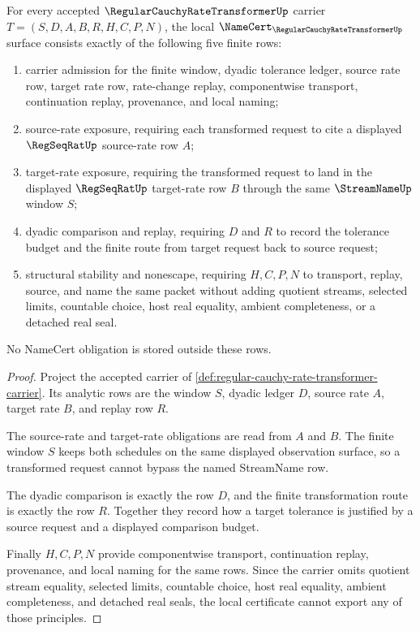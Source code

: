 \begin{theorem}
\label{thm:regular-cauchy-rate-transformer-namecert-obligations}
For every accepted $\RegularCauchyRateTransformerUp$ carrier $T=(S,D,A,B,R,H,C,P,N)$, the local $\NameCert_{\RegularCauchyRateTransformerUp}$ surface consists exactly of the following five finite rows:
\begin{enumerate}
\item carrier admission for the finite window, dyadic tolerance ledger, source rate row, target rate row, rate-change replay, componentwise transport, continuation replay, provenance, and local naming;
\item source-rate exposure, requiring each transformed request to cite a displayed $\RegSeqRatUp$ source-rate row $A$;
\item target-rate exposure, requiring the transformed request to land in the displayed $\RegSeqRatUp$ target-rate row $B$ through the same $\StreamNameUp$ window $S$;
\item dyadic comparison and replay, requiring $D$ and $R$ to record the tolerance budget and the finite route from target request back to source request;
\item structural stability and nonescape, requiring $H,C,P,N$ to transport, replay, source, and name the same packet without adding quotient streams, selected limits, countable choice, host real equality, ambient completeness, or a detached real seal.
\end{enumerate}
No NameCert obligation is stored outside these rows.
\end{theorem}
\begin{proof}
Project the accepted carrier of \autoref{def:regular-cauchy-rate-transformer-carrier}. Its analytic rows are the window $S$, dyadic ledger $D$, source rate $A$, target rate $B$, and replay row $R$.

The source-rate and target-rate obligations are read from $A$ and $B$. The finite window $S$ keeps both schedules on the same displayed observation surface, so a transformed request cannot bypass the named StreamName row.

The dyadic comparison is exactly the row $D$, and the finite transformation route is exactly the row $R$. Together they record how a target tolerance is justified by a source request and a displayed comparison budget.

Finally $H,C,P,N$ provide componentwise transport, continuation replay, provenance, and local naming for the same rows. Since the carrier omits quotient stream equality, selected limits, countable choice, host real equality, ambient completeness, and detached real seals, the local certificate cannot export any of those principles.
\end{proof}

